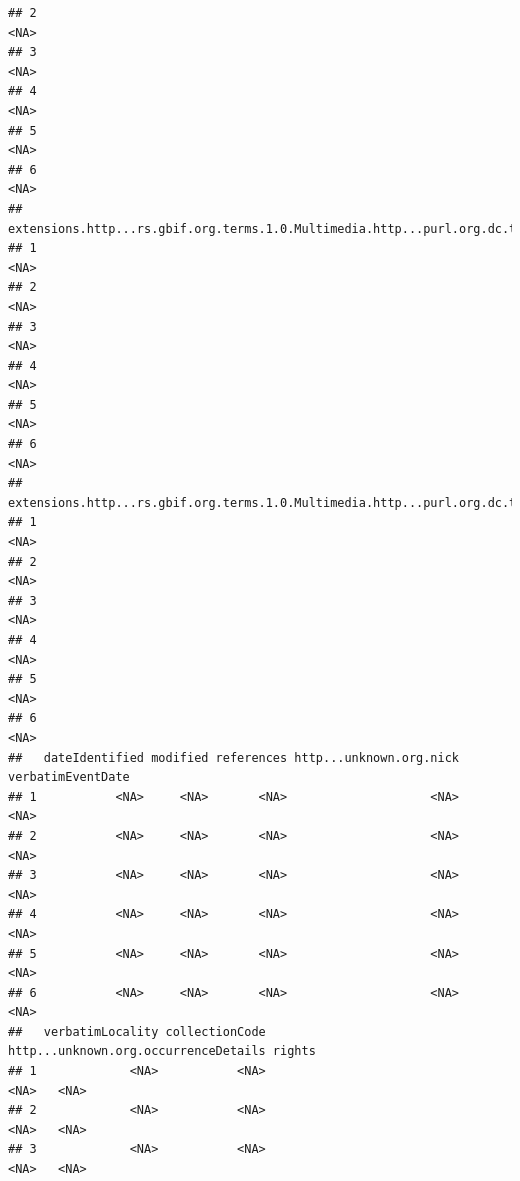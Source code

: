 \documentclass[
]{book}
\begin{document}
\begin{verbatim}
## 2                                                                                 <NA>
## 3                                                                                 <NA>
## 4                                                                                 <NA>
## 5                                                                                 <NA>
## 6                                                                                 <NA>
##   extensions.http...rs.gbif.org.terms.1.0.Multimedia.http...purl.org.dc.terms.references.5
## 1                                                                                     <NA>
## 2                                                                                     <NA>
## 3                                                                                     <NA>
## 4                                                                                     <NA>
## 5                                                                                     <NA>
## 6                                                                                     <NA>
##   extensions.http...rs.gbif.org.terms.1.0.Multimedia.http...purl.org.dc.terms.creator.5
## 1                                                                                  <NA>
## 2                                                                                  <NA>
## 3                                                                                  <NA>
## 4                                                                                  <NA>
## 5                                                                                  <NA>
## 6                                                                                  <NA>
##   dateIdentified modified references http...unknown.org.nick verbatimEventDate
## 1           <NA>     <NA>       <NA>                    <NA>              <NA>
## 2           <NA>     <NA>       <NA>                    <NA>              <NA>
## 3           <NA>     <NA>       <NA>                    <NA>              <NA>
## 4           <NA>     <NA>       <NA>                    <NA>              <NA>
## 5           <NA>     <NA>       <NA>                    <NA>              <NA>
## 6           <NA>     <NA>       <NA>                    <NA>              <NA>
##   verbatimLocality collectionCode http...unknown.org.occurrenceDetails rights
## 1             <NA>           <NA>                                 <NA>   <NA>
## 2             <NA>           <NA>                                 <NA>   <NA>
## 3             <NA>           <NA>                                 <NA>   <NA>

\end{verbatim}
\end{document}
